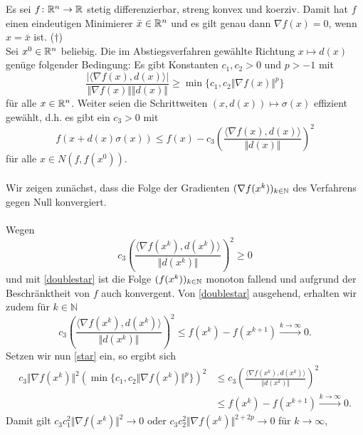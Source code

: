 
Es sei $f\colon\mathbb{R}^n\to\mathbb{R}$ stetig differenzierbar, streng konvex und koerziv.
Damit hat $f$ einen eindeutigen Minimierer $\bar x\in\mathbb{R}^n$ und  es gilt genau dann $\nabla f(x)=0$,
wenn $x=\bar x$ ist. ($\dagger$)\\ 
Sei $x^0\in\mathbb{R}^n$ beliebig.
Die im Abstiegsverfahren gewählte Richtung $x\mapsto d(x)$ genüge
folgender Bedingung: Es gibt Konstanten $c_1,c_2>0$ und $p>-1$ mit
\begin{displaymath}\label{star}
 \frac{|\langle \nabla f(x),d(x)\rangle|}{\Vert\nabla f(x)\Vert\Vert d(x)\Vert}\geq\min\{c_1,c_2\Vert \nabla f(x)\Vert^p\}\tag{$\star$}
\end{displaymath}
für alle $x\in\mathbb{R}^n$. Weiter seien die Schrittweiten $(x,d(x))\mapsto \sigma(x)$
effizient gewählt, d.h. es gibt ein $c_3>0$ mit
\begin{displaymath}\label{doublestar}
 f(x+d(x)\sigma(x))\leq f(x)-c_3\left(\frac{\langle\nabla f(x),d(x)\rangle}{\Vert d(x)\Vert}\right)^2 \tag{$\star\star$}
\end{displaymath}
für alle $x\in N(f,f(x^0))$.
\\ \\
Wir zeigen zunächst, dass die Folge der Gradienten
$(\nabla f(x^k))_{k\in\mathbb{N}}$ des  Verfahrens gegen Null konvergiert.
\\\\
Wegen
\begin{displaymath}
 c_3\left(\frac{\langle\nabla f(x^k),d(x^k)\rangle}{\Vert d(x^k)\Vert}\right)^2\geq0
\end{displaymath}
und  mit \eqref{doublestar} ist die Folge $(f(x^k))_{k\in\mathbb{N}}$ monoton fallend und aufgrund der Beschränktheit von $f$ auch konvergent.
Von \eqref{doublestar} ausgehend, erhalten wir zudem für $k\in\mathbb{N}$
\begin{displaymath}
 c_3\left(\frac{\langle\nabla f(x^k),d(x^k)\rangle}{\Vert d(x^k)\Vert}\right)^2 \leq f(x^k)-f(x^{k+1}) \overset{k\to\infty}{\to} 0.
\end{displaymath}
Setzen wir nun \eqref{star} ein, so ergibt sich
\begin{align*}
 c_3\Vert\nabla f(x^k)\Vert^2 (\min\{c_1,c_2\Vert \nabla f(x^k)\Vert^p\})^2 &\leq c_3\left(\frac{\langle\nabla f(x^k),d(x^k)\rangle}{\Vert d(x^k)\Vert}\right)^2 \\
 &\leq f(x^k)-f(x^{k+1}) \overset{k\to\infty}{\to} 0.
\end{align*}
Damit gilt $c_3c_1^2\Vert\nabla f(x^k)\Vert^2\to 0$ oder $c_3c_2^2\Vert\nabla f(x^k)\Vert^{2+2p}\to 0$ für $k\to\infty$,
